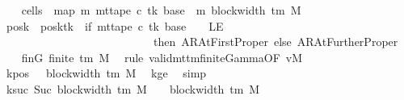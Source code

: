 \begin{isabellebody}
\ \ \isamarkupfalse%
\ {\isacharquery}{\kern0pt}cells{}\ {\isacharequal}{\kern0pt}\ {\isachardoublequoteopen}map\ {\isacharparenleft}{\kern0pt}{\isasymlambda}m{\isachardot}{\kern0pt}\ mt{\isacharunderscore}{\kern0pt}tape\ c{\isacharprime}{\kern0pt}\ tk\ {\isacharparenleft}{\kern0pt}base\ {\isacharplus}{\kern0pt}\ m{\isacharparenright}{\kern0pt}{\isacharparenright}{\kern0pt}\ {\isacharbrackleft}{\kern0pt}{}{\isachardot}{\kern0pt}{\isachardot}{\kern0pt}{\isacharless}{\kern0pt}block{\isacharunderscore}{\kern0pt}width\ {\isacharparenleft}{\kern0pt}{\isasymGamma}{\isacharunderscore}{\kern0pt}tm\ M{\isacharparenright}{\kern0pt}\ {\isacharminus}{\kern0pt}\ {}{\isacharbrackright}{\kern0pt}{\isachardoublequoteclose}\isanewline
\ \ \isamarkupfalse%
\ {\isacharquery}{\kern0pt}posk{\isacharprime}{\kern0pt}\ {\isacharequal}{\kern0pt}\ {\isachardoublequoteopen}posk{\isacharparenleft}{\kern0pt}tk\ {\isacharcolon}{\kern0pt}{\isacharequal}{\kern0pt}\ if\ mt{\isacharunderscore}{\kern0pt}tape\ c{\isacharprime}{\kern0pt}\ tk\ {\isacharparenleft}{\kern0pt}base\ {\isacharminus}{\kern0pt}\ {}{\isacharparenright}{\kern0pt}\ {\isacharequal}{\kern0pt}\ LE{}\isanewline
\ \ \ \ \ \ \ \ \ \ \ \ \ \ \ \ \ \ \ \ \ \ \ \ \ \ \ then\ AR{\isacharunderscore}{\kern0pt}AtFirstProper\ else\ AR{\isacharunderscore}{\kern0pt}AtFurtherProper{\isacharparenright}{\kern0pt}{\isachardoublequoteclose}\isanewline
\ \ \isamarkupfalse%
\ finG{\isacharcolon}{\kern0pt}\ {\isachardoublequoteopen}finite\ {\isacharparenleft}{\kern0pt}{\isasymGamma}{\isacharunderscore}{\kern0pt}tm\ M{\isacharparenright}{\kern0pt}{\isachardoublequoteclose}\ \isamarkupfalse%
\ {\isacharparenleft}{\kern0pt}rule\ valid{\isacharunderscore}{\kern0pt}mttm{\isacharunderscore}{\kern0pt}finite{\isacharunderscore}{\kern0pt}Gamma{\isacharbrackleft}{\kern0pt}OF\ vM{\isacharbrackright}{\kern0pt}{\isacharparenright}{\kern0pt}\isanewline
\ \ \isamarkupfalse%
\ kpos{\isacharcolon}{\kern0pt}\ {\isachardoublequoteopen}{}\ {\isacharless}{\kern0pt}\ block{\isacharunderscore}{\kern0pt}width\ {\isacharparenleft}{\kern0pt}{\isasymGamma}{\isacharunderscore}{\kern0pt}tm\ M{\isacharparenright}{\kern0pt}{\isachardoublequoteclose}\ \isamarkupfalse%
\ kge{}\ \isamarkupfalse%
\ simp\isanewline
\ \ \isamarkupfalse%
\ ksuc{\isacharcolon}{\kern0pt}\ {\isachardoublequoteopen}Suc\ {\isacharparenleft}{\kern0pt}block{\isacharunderscore}{\kern0pt}width\ {\isacharparenleft}{\kern0pt}{\isasymGamma}{\isacharunderscore}{\kern0pt}tm\ M{\isacharparenright}{\kern0pt}\ {\isacharminus}{\kern0pt}\ {}{\isacharparenright}{\kern0pt}\ {\isacharequal}{\kern0pt}\ block{\isacharunderscore}{\kern0pt}width\ {\isacharparenleft}{\kern0pt}{\isasymGamma}{\isacharunderscore}{\kern0pt}tm\ M{\isacharparenright}{\kern0pt}{\isachardoublequoteclose}\isanewline

\end{isabellebody}
